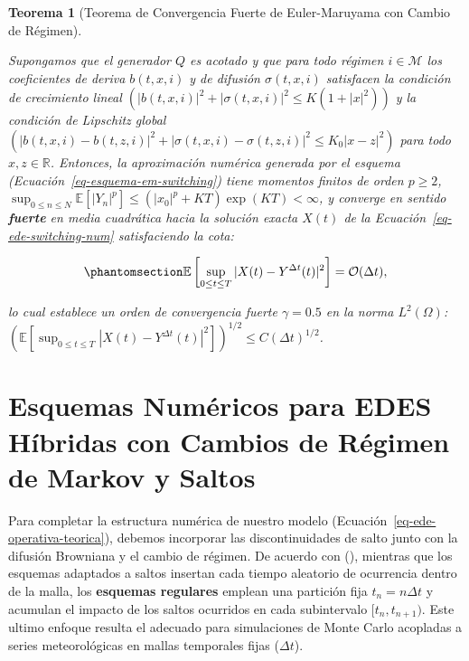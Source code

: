 \documentclass[
  spanish,
  us-letterpaper,
]{scrreprt}
\numberwithin{equation}{section}
\theoremstyle{plain}
\newtheorem{theorem}{Teorema}[chapter]
\theoremstyle{plain}
\theoremstyle{plain}
\theoremstyle{definition}
\theoremstyle{remark}
\begin{document}
\begin{theorem}[Teorema de Convergencia Fuerte de Euler-Maruyama con
Cambio de
Régimen]\protect\hypertarget{thm-em-switching}{}\label{thm-em-switching}

Supongamos que el generador \(Q\) es acotado y que para todo régimen
\(i \in \mathcal{M}\) los coeficientes de deriva \(b(t, x, i)\) y de
difusión \(\sigma(t, x, i)\) satisfacen la condición de crecimiento
lineal
\(\left( |b(t, x, i)|^2 + |\sigma(t, x, i)|^2 \le K(1 + |x|^2)\right)\)
y la condición de Lipschitz global
\(\left( |b(t, x, i) - b(t, z, i)|^2 + |\sigma(t, x, i) - \sigma(t, z, i)|^2 \le K_0|x - z|^2 \right)\)
para todo \(x, z \in \mathbb{R}\). Entonces, la aproximación numérica
generada por el esquema (Ecuación~\ref{eq-esquema-em-switching}) tiene
momentos finitos de orden \(p \ge 2\),
\(\displaystyle \sup_{0 \le n \le N} \mathbb{E}[|Y_n|^p] \le (|x_0|^p + KT)\exp(KT) < \infty\),
y converge en sentido \textbf{fuerte} en media cuadrática hacia la
solución exacta \(X(t)\) de la Ecuación~\ref{eq-ede-switching-num}
satisfaciendo la cota:

\begin{equation}\phantomsection\label{eq-cota-fuerte-switching}{
\mathbb{E}\left[ \sup_{0 \le t \le T} \vert X(t) - Y^{\Delta t}(t) \vert^2 \right] = \mathcal{O}(\Delta t),
}\end{equation}

lo cual establece un orden de convergencia fuerte \(\gamma = 0.5\) en la
norma \(\displaystyle L^2(\Omega)\):
\(\displaystyle \left(\mathbb{E}[\sup_{0 \le t \le T} |X(t) - Y^{\Delta t}(t)|^2]\right)^{1/2} \le C(\Delta t)^{1/2}\).

\end{theorem}

\section{Esquemas Numéricos para EDES Híbridas con Cambios de Régimen de
Markov y Saltos}\label{sec-numerico-saltos}

Para completar la estructura numérica de nuestro modelo
(Ecuación~\ref{eq-ede-operativa-teorica}), debemos incorporar las
discontinuidades de salto junto con la difusión Browniana y el cambio de
régimen. De acuerdo con (), mientras que los esquemas adaptados a saltos
insertan cada tiempo aleatorio de ocurrencia dentro de la malla, los
\textbf{esquemas regulares} emplean una partición fija
\(t_n = n\Delta t\) y acumulan el impacto de los saltos ocurridos en
cada subintervalo \([t_n, t_{n+1})\). Este ultimo enfoque resulta el
adecuado para simulaciones de Monte Carlo acopladas a series
meteorológicas en mallas temporales fijas (\(\Delta t\)).
\end{document}
